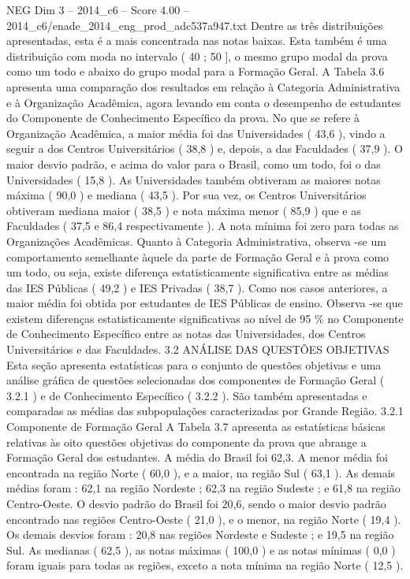 \begin{textsample}{NEG Dim 3 – 2014\_c6 – Score 4.00 – 2014\_c6/enade\_2014\_eng\_prod\_adc537a947.txt}
Dentre as três distribuições apresentadas, esta é a mais concentrada nas notas baixas.
Esta também é uma distribuição com moda no intervalo ( 40 ; 50 ], o mesmo grupo modal da prova como um todo e abaixo do grupo modal para a Formação Geral.
A Tabela 3.6 apresenta uma comparação dos resultados em relação à Categoria Administrativa e à Organização Acadêmica, agora levando em conta o desempenho de estudantes do Componente de Conhecimento Específico da prova.
No que se refere à Organização Acadêmica, a maior média foi das Universidades ( 43,6 ), vindo a seguir a dos Centros Universitários ( 38,8 ) e, depois, a das Faculdades ( 37,9 ).
O maior desvio padrão, e acima do valor para o Brasil, como um todo, foi o das Universidades ( 15,8 ).
As Universidades também obtiveram as maiores notas máxima ( 90,0 ) e mediana ( 43,5 ).
Por sua vez, os Centros Universitários obtiveram mediana maior ( 38,5 ) e nota máxima menor ( 85,9 ) que e as Faculdades ( 37,5 e 86,4 respectivamente ).
A nota mínima foi zero para todas as Organizações Acadêmicas.
Quanto à Categoria Administrativa, observa -se um comportamento semelhante àquele da parte de Formação Geral e à prova como um todo, ou seja, existe diferença estatisticamente significativa entre as médias das IES Públicas ( 49,2 ) e IES Privadas ( 38,7 ).
Como nos casos anteriores, a maior média foi obtida por estudantes de IES Públicas de ensino.
Observa -se que existem diferenças estatisticamente significativas ao nível de 95 \% no Componente de Conhecimento Específico entre as notas das Universidades, dos Centros Universitários e das Faculdades. 3.2 ANÁLISE DAS QUESTÕES OBJETIVAS Esta seção apresenta estatísticas para o conjunto de questões objetivas e uma análise gráfica de questões selecionadas dos componentes de Formação Geral ( 3.2.1 ) e de Conhecimento Específico ( 3.2.2 ).
São também apresentadas e comparadas as médias das subpopulações caracterizadas por Grande Região. 3.2.1 Componente de Formação Geral A Tabela 3.7 apresenta as estatísticas básicas relativas às oito questões objetivas do componente da prova que abrange a Formação Geral dos estudantes.
A média do Brasil foi 62,3.
A menor média foi encontrada na região Norte ( 60,0 ), e a maior, na região Sul ( 63,1 ).
As demais médias foram : 62,1 na região Nordeste ; 62,3 na região Sudeste ; e 61,8 na região Centro-Oeste.
O desvio padrão do Brasil foi 20,6, sendo o maior desvio padrão encontrado nas regiões Centro-Oeste ( 21,0 ), e o menor, na região Norte ( 19,4 ).
Os demais desvios foram : 20,8 nas regiões Nordeste e Sudeste ; e 19,5 na região Sul.
As medianas ( 62,5 ), as notas máximas ( 100,0 ) e as notas mínimas ( 0,0 ) foram iguais para todas as regiões, exceto a nota mínima na região Norte ( 12,5 ).

\end{textsample}
